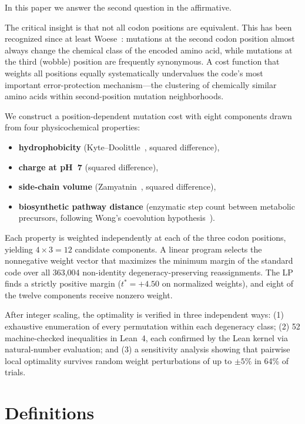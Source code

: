 \documentclass[11pt,twocolumn]{article}
\begin{document}
In this paper we answer the second question in the affirmative.

The critical insight is that not all codon positions are equivalent.
This has been recognized since at least Woese~\cite{Woese1966}: mutations
at the second codon position almost always change the chemical class of
the encoded amino acid, while mutations at the third (wobble) position are
frequently synonymous. A cost function that weights all positions equally
systematically undervalues the code's most important error-protection
mechanism---the clustering of chemically similar amino acids within
second-position mutation neighborhoods.

We construct a position-dependent mutation cost with eight components drawn
from four physicochemical properties:
\begin{itemize}
\item \textbf{hydrophobicity} (Kyte--Doolittle~\cite{KyteDoolittle1982},
  squared difference),
\item \textbf{charge at pH~7} (squared difference),
\item \textbf{side-chain volume} (Zamyatnin~\cite{Zamyatnin1972},
  squared difference),
\item \textbf{biosynthetic pathway distance} (enzymatic step count between
  metabolic precursors, following Wong's
  coevolution hypothesis~\cite{Wong1975}).
\end{itemize}
Each property is weighted independently at each of the three codon
positions, yielding $4 \times 3 = 12$ candidate components. A linear
program selects the nonnegative weight vector that maximizes the minimum
margin of the standard code over all 363,004 non-identity
degeneracy-preserving reassignments. The LP finds a strictly positive
margin ($t^* = +4.50$ on normalized weights), and eight of the twelve
components receive nonzero weight.

After integer scaling, the optimality is verified in three independent
ways: (1) exhaustive enumeration of every permutation within each
degeneracy class; (2) 52 machine-checked inequalities in Lean~4, each
confirmed by the Lean kernel via natural-number evaluation; and (3) a
sensitivity analysis showing that pairwise local optimality survives
random weight perturbations of up to $\pm 5\%$ in 64\% of trials.

\section{Definitions}
\end{document}
